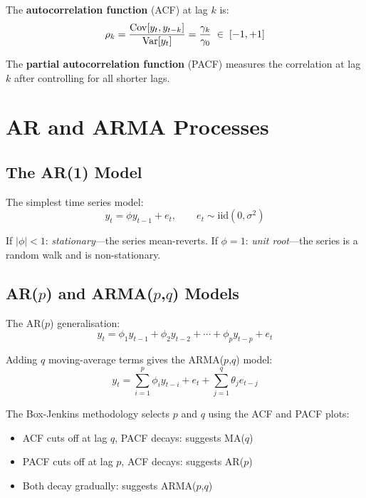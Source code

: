 The \textbf{autocorrelation function} (ACF)
at lag $k$ is:
\begin{equation}
  \rho_k = \frac{\operatorname{Cov}[y_t, y_{t-k}]}{\operatorname{Var}[y_t]} = \frac{\gamma_k}{\gamma_0}
  \;\in\; [-1,+1]
\end{equation}

The \textbf{partial autocorrelation function} (PACF) measures the
correlation at lag $k$ after controlling for all shorter lags.


\section{AR and ARMA Processes}
\label{sec_ARMA}

\subsection{The AR(1) Model}

The simplest time series model:
\begin{equation}
  y_t = \phi y_{t-1} + e_t, \qquad e_t \sim \text{iid}(0,\sigma^2)
\end{equation}

If $|\phi| < 1$: \emph{stationary}---the series mean-reverts.
If $\phi = 1$: \emph{unit root}---the series is a random walk and is
non-stationary.

\subsection{AR($p$) and ARMA($p$,$q$) Models}

The AR($p$) generalisation:
\begin{equation}
  y_t = \phi_1 y_{t-1} + \phi_2 y_{t-2} + \cdots + \phi_p y_{t-p} + e_t
\end{equation}

Adding $q$ moving-average terms gives the ARMA($p$,$q$) model:
\begin{equation}
  y_t = \sum_{i=1}^{p}\phi_i y_{t-i} + e_t + \sum_{j=1}^{q}\theta_j e_{t-j}
\end{equation}

The Box-Jenkins methodology selects $p$ and $q$ using the ACF and PACF
plots:
\begin{itemize}
  \item ACF cuts off at lag $q$, PACF decays: suggests MA($q$)
  \item PACF cuts off at lag $p$, ACF decays: suggests AR($p$)
  \item Both decay gradually: suggests ARMA($p$,$q$)
\end{itemize}

